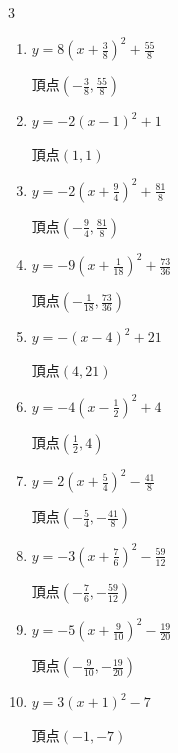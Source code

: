 \begin{multicols}{3}
\begin{enumerate}
        $\displaystyle 頂点\left( -\frac{1}{9} , -\frac{64}{9} \right)$

  \item $\displaystyle y=8\left( x+\frac{3}{8}\right)^{2}+\frac{55}{8}$

        $\displaystyle 頂点\left( -\frac{3}{8} , \frac{55}{8} \right)$

  \item $\displaystyle y=-2\left( x-1\right)^{2}+1$

        $\displaystyle 頂点\left( 1 , 1 \right)$

  \item $\displaystyle y=-2\left( x+\frac{9}{4}\right)^{2}+\frac{81}{8}$

        $\displaystyle 頂点\left( -\frac{9}{4} , \frac{81}{8} \right)$

  \item $\displaystyle y=-9\left( x+\frac{1}{18}\right)^{2}+\frac{73}{36}$

        $\displaystyle 頂点\left( -\frac{1}{18} , \frac{73}{36} \right)$

  \item $\displaystyle y=-\left( x-4\right)^{2}+21$

        $\displaystyle 頂点\left( 4 , 21 \right)$

  \item $\displaystyle y=-4\left( x-\frac{1}{2}\right)^{2}+4$

        $\displaystyle 頂点\left( \frac{1}{2} , 4 \right)$

  \item $\displaystyle y=2\left( x+\frac{5}{4}\right)^{2}-\frac{41}{8}$

        $\displaystyle 頂点\left( -\frac{5}{4} , -\frac{41}{8} \right)$

  \item $\displaystyle y=-3\left( x+\frac{7}{6}\right)^{2}-\frac{59}{12}$

        $\displaystyle 頂点\left( -\frac{7}{6} , -\frac{59}{12} \right)$

  \item $\displaystyle y=-5\left( x+\frac{9}{10}\right)^{2}-\frac{19}{20}$

        $\displaystyle 頂点\left( -\frac{9}{10} , -\frac{19}{20} \right)$

  \item $\displaystyle y=3\left( x+1\right)^{2}-7$

        $\displaystyle 頂点\left( -1 , -7 \right)$


\end{enumerate}
\end{multicols}
